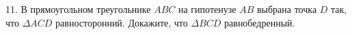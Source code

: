 11. В прямоугольном треугольнике $ABC$ на гипотенузе $AB$ выбрана точка $D$ так, что
$\Delta ACD$ равносторонний. Докажите, что $\Delta BCD$ равнобедренный.\\

